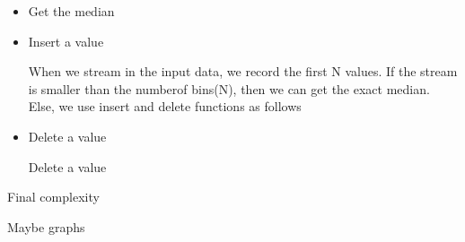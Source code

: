 \begin{itemize}
  \item Get the median
  
  
  
  \item Insert a value
  
  When we stream in the input data, we record the first N values. If the stream is smaller than the numberof bins(N), then we can get the exact median. Else, we use insert and delete functions as follows
 
  \item Delete a value
  
  Delete a value
  
\end{itemize}







Final complexity

Maybe graphs

